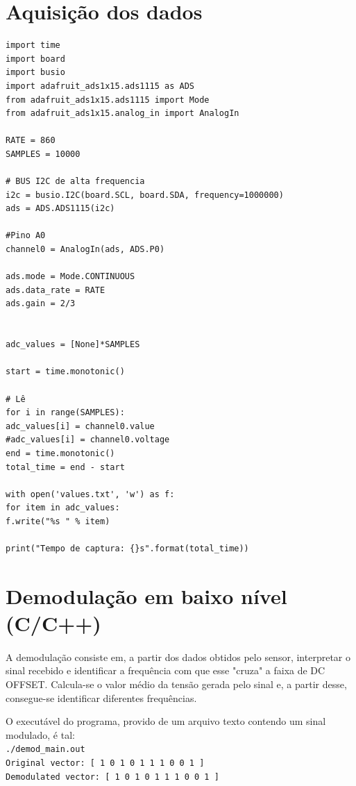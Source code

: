 \documentclass[11pt,a4paper]{report}
\begin{document}
	\section{Aquisição dos dados}
		\begin{verbatim}
import time
import board
import busio
import adafruit_ads1x15.ads1115 as ADS
from adafruit_ads1x15.ads1115 import Mode
from adafruit_ads1x15.analog_in import AnalogIn
		
RATE = 860
SAMPLES = 10000
		
# BUS I2C de alta frequencia
i2c = busio.I2C(board.SCL, board.SDA, frequency=1000000)
ads = ADS.ADS1115(i2c)
		
#Pino A0
channel0 = AnalogIn(ads, ADS.P0)
		
ads.mode = Mode.CONTINUOUS
ads.data_rate = RATE
ads.gain = 2/3
		
		
adc_values = [None]*SAMPLES
		
start = time.monotonic()
		
# Lê
for i in range(SAMPLES):
adc_values[i] = channel0.value
#adc_values[i] = channel0.voltage
end = time.monotonic()
total_time = end - start
		
with open('values.txt', 'w') as f:
for item in adc_values:
f.write("%s " % item)
		
print("Tempo de captura: {}s".format(total_time))
		\end{verbatim}


	\section{Demodulação em baixo nível (C/C++)}
	\paragraph{}
		A demodulação consiste em, a partir dos dados obtidos pelo sensor, interpretar o sinal recebido e identificar a frequência com que esse "cruza" a faixa de DC OFFSET. Calcula-se o valor médio da tensão gerada pelo sinal e, a partir desse, consegue-se identificar diferentes frequências.
		
		O executável do programa, provido de um arquivo texto contendo um sinal modulado, é tal:\\
		
		\texttt{./demod\_main.out\\                                       
			Original vector: [ 1 0 1 0 1 1 1 0 0 1 ]
\\
			Demodulated vector: [ 1 0 1 0 1 1 1 0 0 1 ]
}
		
\end{document}

